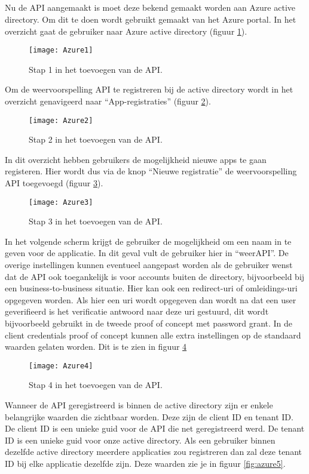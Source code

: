 \subsection{}
Nu de API aangemaakt is moet deze bekend gemaakt worden aan Azure active directory. Om dit te doen wordt gebruikt gemaakt van het Azure portal. In het overzicht gaat de gebruiker naar Azure active directory (figuur \ref{fig:azure1}).
\begin{figure}[H]
	\centering
	\texttt{[image: Azure1]} 
	\caption[BeginAzure]{Stap 1 in het toevoegen van de API.}
	\label{fig:azure1}
\end{figure}
Om de weervoorspelling API te registreren bij de active directory wordt in het overzicht genavigeerd naar “App-registraties” (figuur \ref{fig:azure2}).
\begin{figure}[H]
	\centering
	\texttt{[image: Azure2]} 
	\caption[Azure2]{Stap 2 in het toevoegen van de API.}
	\label{fig:azure2}
\end{figure}
In dit overzicht hebben gebruikers de mogelijkheid nieuwe apps te gaan registeren. Hier wordt dus via de knop “Nieuwe registratie” de weervoorspelling API toegevoegd (figuur \ref{fig:azure3}).
\begin{figure}[H]
	\centering
	\texttt{[image: Azure3]} 
	\caption[Azure3]{Stap 3 in het toevoegen van de API.}
	\label{fig:azure3}
\end{figure}
In het volgende scherm krijgt de gebruiker de mogelijkheid om een naam in te geven voor de applicatie. In dit geval vult de gebruiker hier in “weerAPI”. De overige instellingen kunnen eventueel aangepast worden als de gebruiker wenst dat de API ook toegankelijk is voor accounts buiten de directory, bijvoorbeeld bij een business-to-business situatie. Hier kan ook een redirect-uri of omleidings-uri opgegeven worden. Als hier een uri wordt opgegeven dan wordt na dat een user geverifieerd is het verificatie antwoord naar deze uri gestuurd, dit wordt bijvoorbeeld gebruikt in de tweede proof of concept met password grant. In de client credentials proof of concept kunnen alle extra instellingen op de standaard waarden gelaten worden. Dit is te zien in figuur \ref{fig:azure4}
\begin{figure}[H]
	\centering
	\texttt{[image: Azure4]} 
	\caption[Azure4]{Stap 4 in het toevoegen van de API.}
	\label{fig:azure4}
\end{figure}\newpage
Wanneer de API geregistreerd is binnen de active directory zijn er enkele belangrijke waarden die zichtbaar worden. Deze zijn de client ID en tenant ID. De client ID is een unieke guid voor de API die net geregistreerd werd. De tenant ID is een unieke guid voor onze active directory. Als een gebruiker binnen dezelfde active directory meerdere applicaties zou registreren dan zal deze tenant ID bij elke applicatie dezelfde zijn. Deze waarden zie je in figuur \ref{fig:azure5}.
